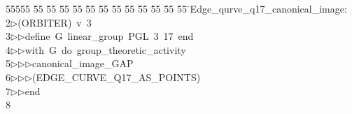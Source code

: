 %
%
\begin{tabbing}
55555 \= 55 \= 55 \= 55 \= 55 \= 55 \= 55 \= 55 \= 55 \= 55 \= 55 \= 55 \= 55 \= \>Edge\_qurve\_q17\_canonical\_image:\\[0pt]
2\>$\triangleright$\>(ORBITER)\ v\ 3\ \\[0pt]
3\>$\triangleright$\>$\triangleright$\>define\ G\ linear\_group\ PGL\ 3\ 17\ end\ \\[0pt]
4\>$\triangleright$\>$\triangleright$\>with\ G\ do\ group\_theoretic\_activity\ \\[0pt]
5\>$\triangleright$\>$\triangleright$\>$\triangleright$\>canonical\_image\_GAP\ \\[0pt]
6\>$\triangleright$\>$\triangleright$\>$\triangleright$\>(EDGE\_CURVE\_Q17\_AS\_POINTS)\ \\[0pt]
7\>$\triangleright$\>$\triangleright$\>end\\[0pt]
8\>\end{tabbing}
